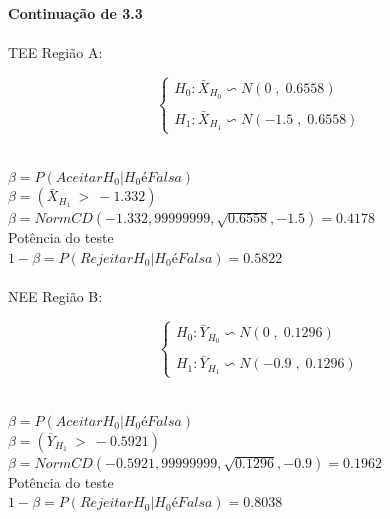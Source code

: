 \\
\textbf{Continuação de 3.3} \\
\\
TEE Região A:\\
\begin{minipage}[l]{0pt}
	$$\left\lbrace\begin{array}{l}
		H_0: \bar{X}_{H_0} \backsim N (0 \;,\; 0.6558) \\
		\\
		H_1: \bar{X}_{H_1} \backsim N (-1.5 \;,\; 0.6558)
	\end{array}\right.$$
\end{minipage}\\
$\beta=P(Aceitar H_0 | H_0 é Falsa)$ \\
$\beta=(\bar{X}_{H_1} \:>\: -1.332)$	\\
$\beta=NormCD(-1.332,99999999,\sqrt{0.6558},-1.5)=0.4178$ \\
Potência do teste \\
$1-\beta=P(Rejeitar H_0 | H_0 é Falsa)=0.5822$\\
\\
NEE Região B:\\
\begin{minipage}[l]{0pt}
	$$\left\lbrace\begin{array}{l}
		H_0: \bar{Y}_{H_0} \backsim N (0 \;,\; 0.1296) \\
		\\
		H_1: \bar{Y}_{H_1} \backsim N (-0.9 \;,\; 0.1296)
	\end{array}\right.$$
\end{minipage}\\
$\beta=P(Aceitar H_0 | H_0 é Falsa)$ \\
$\beta=(\bar{Y}_{H_1} \:>\: -0.5921)$	\\
$\beta=NormCD(-0.5921,99999999,\sqrt{0.1296},-0.9)=0.1962$ \\
Potência do teste \\
$1-\beta=P(Rejeitar H_0 | H_0 é Falsa)=0.8038$\\
